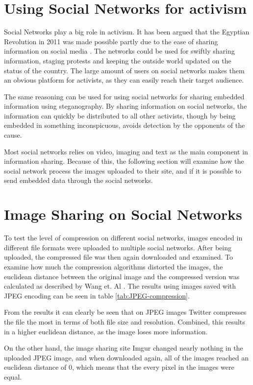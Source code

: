 \clearpage
\section{Using Social Networks for activism}
Social Networks play a big role in activism. 
It has been argued that the Egyptian Revolution in 2011 was made possible partly due to the ease of sharing information on social media \citep{IJoC1242}. 
The networks could be used for swiftly sharing information, staging protests and keeping the outside world updated on the status of the country.
The large amount of users on social networks makes them an obvious platform for activists, as they can easily reach their target audience. 

The same reasoning can be used for using social networks for sharing embedded information using steganography. 
By sharing information on social networks, the information can quickly be distributed to all other activists, though by being embedded in something inconspicuous, avoids detection by the opponents of the cause.

Most social networks relies on video, imaging and text as the main component in information sharing.
Because of this, the following section will examine how the social network process the images uploaded to their site, and if it is possible to send embedded data through the social networks.

\section{Image Sharing on Social Networks}

To test the level of compression on different social networks, images encoded in different file formats were uploaded to multiple social networks. 
After being uploaded, the compressed file was then again downloaded and examined.
To examine how much the compression algorithms distorted the images, the euclidean distance between the original image and the compressed version was calculated as described by Wang et. Al \citep{Wang2005}.
The results using images saved with JPEG encoding can be seen in table \ref{tab:JPEG-compression}. 

From the results it can clearly be seen that on JPEG images Twitter compresses the file the most in terms of both file size and resolution.
Combined, this results in a higher euclidean distance, as the image loses more information. 

On the other hand, the image sharing site Imgur changed nearly nothing in the uploaded JPEG image, and when downloaded again, all of the images reached an euclidean distance of 0, which means that the every pixel in the images were equal.

